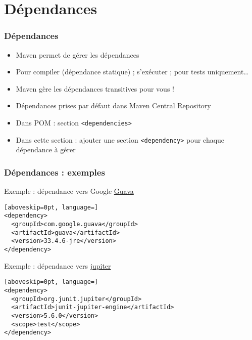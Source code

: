 \documentclass[english, french]{beamer}
\begin{document}
\section{Dépendances}
\begin{frame}
	\frametitle{Dépendances}
	\begin{itemize}
		\item Maven permet de gérer les \og{}dépendances\fg{}
		\item Pour compiler (dépendance statique) ; s’exécuter ; pour tests uniquement…
		\item Maven gère les dépendances transitives pour vous !
		\item Dépendances prises {\tiny par défaut} dans Maven Central Repository
		\item Dans POM : section \texttt{<dependencies>}
		\item Dans cette section : ajouter une section \texttt{<dependency>} pour chaque dépendance à gérer
	\end{itemize}
\end{frame}

\begin{frame}[fragile]
	\frametitle{Dépendances : exemples}
	\begin{block}{Exemple : dépendance vers Google \href{https://github.com/google/guava/blob/master/README.md}{Guava}}
		\begin{lstlisting}[aboveskip=0pt, language=]
<dependency>
  <groupId>com.google.guava</groupId>
  <artifactId>guava</artifactId>
  <version>33.4.6-jre</version>
</dependency>
\end{lstlisting}
	\end{block}
	\begin{block}{Exemple : dépendance vers \href{https://search.maven.org/search?q=g:org.junit.jupiter}{jupiter}}
		\begin{lstlisting}[aboveskip=0pt, language=]
<dependency>
  <groupId>org.junit.jupiter</groupId>
  <artifactId>junit-jupiter-engine</artifactId>
  <version>5.6.0</version>
  <scope>test</scope>
</dependency>
\end{lstlisting}
	\end{block}
\end{frame}
\end{document}

